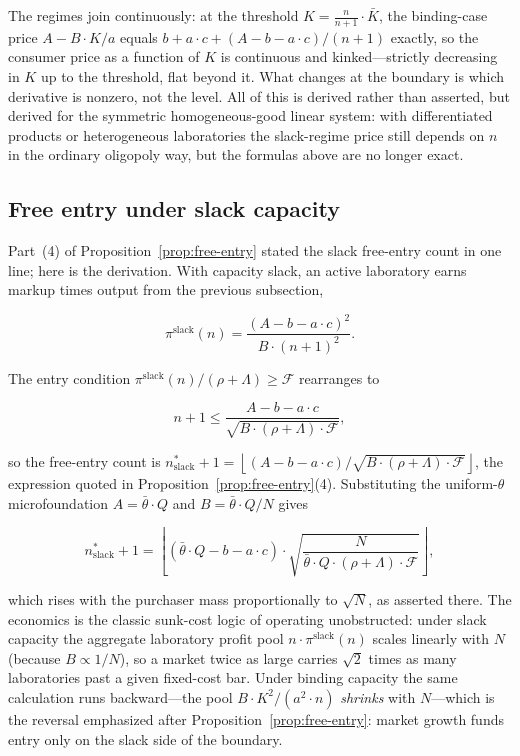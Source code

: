 \documentclass[11pt]{article}
\begin{document}
The regimes join continuously: at the threshold $K=\frac{n}{n+1}\cdot\bar K$, the binding-case price $A-B\cdot K/a$ equals $b+a\cdot c+(A-b-a\cdot c)/(n+1)$ exactly, so the consumer price as a function of $K$ is continuous and kinked---strictly decreasing in $K$ up to the threshold, flat beyond it. What changes at the boundary is which derivative is nonzero, not the level. All of this is derived rather than asserted, but derived for the symmetric homogeneous-good linear system: with differentiated products or heterogeneous laboratories the slack-regime price still depends on $n$ in the ordinary oligopoly way, but the formulas above are no longer exact.

\subsection{Free entry under slack capacity}
\label{subsec:slack-free-entry}

Part~(4) of Proposition~\ref{prop:free-entry} stated the slack free-entry count in one line; here is the derivation. With capacity slack, an active laboratory earns markup times output from the previous subsection,

\begin{equation}\pi^{\mathrm{slack}}(n)=\frac{(A-b-a\cdot c)^{2}}{B\cdot(n+1)^{2}}.\end{equation}

The entry condition $\pi^{\mathrm{slack}}(n)/(\rho+\Lambda)\geq\mathcal F$ rearranges to

\begin{equation}n+1\leq\frac{A-b-a\cdot c}{\sqrt{B\cdot(\rho+\Lambda)\cdot\mathcal F}},\end{equation}

so the free-entry count is $n^{*}_{\mathrm{slack}}+1=\left\lfloor(A-b-a\cdot c)/\sqrt{B\cdot(\rho+\Lambda)\cdot\mathcal F}\right\rfloor$, the expression quoted in Proposition~\ref{prop:free-entry}(4). Substituting the uniform-$\theta$ microfoundation $A=\bar\theta\cdot Q$ and $B=\bar\theta\cdot Q/N$ gives

\begin{equation}n^{*}_{\mathrm{slack}}+1=\left\lfloor\left(\bar\theta\cdot Q-b-a\cdot c\right)\cdot\sqrt{\frac{N}{\bar\theta\cdot Q\cdot(\rho+\Lambda)\cdot\mathcal F}}\right\rfloor,\end{equation}

which rises with the purchaser mass proportionally to $\sqrt N$, as asserted there. The economics is the classic sunk-cost logic of \citet{sutton1991} operating unobstructed: under slack capacity the aggregate laboratory profit pool $n\cdot\pi^{\mathrm{slack}}(n)$ scales linearly with $N$ (because $B\propto1/N$), so a market twice as large carries $\sqrt2$ times as many laboratories past a given fixed-cost bar. Under binding capacity the same calculation runs backward---the pool $B\cdot K^{2}/(a^{2}\cdot n)$ \emph{shrinks} with $N$---which is the reversal emphasized after Proposition~\ref{prop:free-entry}: market growth funds entry only on the slack side of the boundary.
\end{document}
